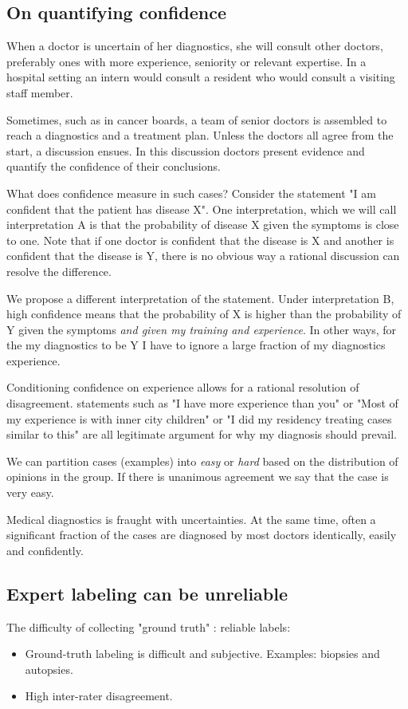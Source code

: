 \documentclass[fleqn,10pt]{wlscirep}
\begin{document}
\subsection*{On quantifying confidence}

When a doctor is uncertain of her diagnostics, she  will consult other doctors, preferably ones with more experience, seniority or relevant expertise. In a hospital setting an intern would consult a resident who would consult a visiting staff member.

Sometimes, such as in cancer boards, a team of senior doctors is assembled to reach a diagnostics and a treatment plan. 
Unless the doctors all agree from the start, a discussion ensues. In this discussion doctors present evidence and quantify the confidence of their conclusions.

What does confidence measure in such cases? Consider the statement "I am confident that the patient has disease X".
One interpretation, which we will call interpretation A is that the probability of disease X given the symptoms is close to one. Note that if one doctor is confident that the disease is X and another is confident that the disease is Y, there is no obvious way a rational discussion can resolve the difference.

We propose a different interpretation of the statement. Under interpretation B, high confidence means that the probability of X is higher than the probability of Y given the symptoms {\em and given my training and experience}. In other ways, for the my diagnostics to be Y I have to ignore a large fraction of my diagnostics experience.

Conditioning confidence on experience allows for a rational resolution of disagreement. statements such as
"I have more experience than you" or "Most of my experience is with inner city children" or "I did my residency treating cases similar to this" are all legitimate argument for why my diagnosis should prevail.



We can partition cases (examples) into {\em easy} or {\em hard} based on the distribution of opinions in the group. If  there is unanimous agreement we say that the case is very easy. 


Medical diagnostics is fraught with uncertainties. At the same time, often a significant fraction of the cases are diagnosed by most doctors identically, easily and confidently.



\subsection*{Expert labeling can be unreliable \label{sec:UnreliableExperts}}
The difficulty of collecting "ground truth" : reliable labels:
\begin{itemize}
    \item Ground-truth labeling is difficult and subjective. Examples: biopsies and autopsies.
    \item High inter-rater disagreement.
\end{itemize}
\end{document}
